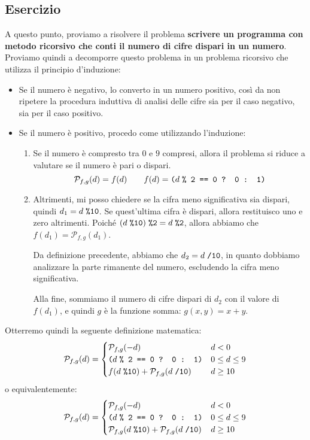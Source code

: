 \documentclass[]{scrartcl}
\newcommand{\prog}{\ensuremath{\mathcal{P}_{f,g}}}
\begin{document}
\subsection{Esercizio}
A questo punto, proviamo a risolvere il problema \textbf{scrivere un programma con metodo ricorsivo che conti il numero di cifre dispari in un numero}. Proviamo quindi a decomporre questo problema in un problema ricorsivo che utilizza il principio d'induzione:
\begin{itemize}
\item Se il numero è negativo, lo converto in un numero positivo, così da non ripetere la procedura induttiva di analisi delle cifre sia per il caso negativo, sia per il caso positivo.
\item Se il numero è positivo, procedo come utilizzando l'induzione:
\begin{enumerate}
	\item Se il numero è compresto tra $0$ e $9$ compresi, allora il problema si riduce a valutare se il numero è pari o dispari.
	\[\prog(d)=f(d)\qquad f(d)=\texttt{(}d \texttt{\;\% 2 == 0 ? 0 : 1)}\]
	\item Altrimenti, mi posso chiedere se la cifra meno significativa sia dispari, quindi $d_1 = d\texttt{\;\%10}$. Se quest'ultima cifra è dispari, allora restituisco uno e zero altrimenti. Poiché $(d\texttt{\;\%10})\texttt{\;\%2}=d\texttt{\;\%2}$, allora abbiamo che $f(d_1)=\prog(d_1)$.
	
	Da definizione precedente, abbiamo che $d_2 = d\texttt{\;/10}$, in quanto dobbiamo analizzare la parte rimanente del numero, escludendo la cifra meno significativa.
	
	Alla fine, sommiamo il numero di cifre dispari di $d_2$ con il valore di $f(d_1)$, e quindi $g$ è la funzione somma: $g(x,y)=x+y$. 
\end{enumerate}
\end{itemize}
Otterremo quindi la seguente definizione matematica:
\[\prog(d)=\begin{cases}
\prog(-d) & d < 0\\
\texttt{(}d \texttt{\;\% 2 == 0 ? 0 : 1)} & 0\leq d\leq 9\\
f(d\texttt{\;\%10})+\prog(d\texttt{\;/10}) & d\geq 10\\
\end{cases}\]
o equivalentemente:
\[\prog(d)=\begin{cases}
\prog(-d) & d < 0\\
\texttt{(}d \texttt{\;\% 2 == 0 ? 0 : 1)} & 0\leq d\leq 9\\
\prog(d\texttt{\;\%10})+\prog(d\texttt{\;/10}) & d\geq 10\\
\end{cases}\]
\end{document}
